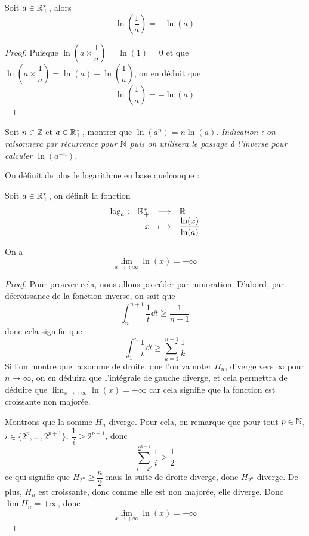 \begin{prop}
    Soit $a\in\mathbb{R}_+^*$, alors $$\ln\left(\dfrac{1}{a}\right) = -\ln(a)$$
\end{prop}

\begin{proof}
    Puisque $\ln\left(a\times \dfrac{1}{a}\right) = \ln(1) = 0$ et que $\ln\left(a\times \dfrac{1}{a}\right) = \ln(a) + \ln\left(\dfrac{1}{a}\right)$, on en déduit que $$\boxed{\ln\left(\dfrac{1}{a}\right) = -\ln(a)}$$
\end{proof}

\begin{exo}
    Soit $n\in\mathbb Z$ et $a\in\mathbb{R}_+^*$, montrer que $\ln(a^n) = n\ln(a)$. \textit{Indication : on raisonnera par récurrence pour $\mathbb{N}$ puis on utilisera le passage à l'inverse pour calculer $\ln(a^{-n})$.}
\end{exo}

On définit de plus le logarithme en base quelconque :

\begin{defi}
    Soit $a\in\mathbb{R}_+^*$, on définit la fonction $$\begin{array}[t]{lrcl} \log_a: & \mathbb{R}_+^* & \longrightarrow & \mathbb{R} \\ & x & \longmapsto & \dfrac{\ln(x)}{\ln(a)} \end{array}$$
\end{defi}

\begin{prop}
    On a $$\lim_{x\to+\infty}\ln(x) = +\infty$$
\end{prop}

\begin{proof}
    Pour prouver cela, nous allons procéder par minoration. D'abord, par décroissance de la fonction inverse, on sait que $$\int_{n}^{n+1}\frac{1}{t}\dd t \geq \frac{1}{n+1}$$ donc cela signifie que $$\int_{1}^n \frac{1}{t}\dd t \geq \sum_{k = 1}^{n-1}\frac{1}{k}$$ Si l'on montre que la somme de droite, que l'on va noter $H_n$, diverge vers $\infty$ pour $n\to\infty$, on en déduira que l'intégrale de gauche diverge, et cela permettra de déduire que $\displaystyle\lim_{x\to+\infty}\ln(x) = +\infty$ car cela signifie que la fonction est croissante non majorée.

    Montrons que la somme $H_n$ diverge. Pour cela, on remarque que pour tout $p\in \mathbb{N}$, $i \in\{2^p,\ldots,2^{p+1}\}$, $\dfrac{1}{i}\geq 2^{p+1}$, donc $$\sum_{i = 2^p}^{2^{p-1}} \frac{1}{i} \geq \frac{1}{2}$$ ce qui signifie que $H_{2^n} \geq \dfrac{n}{2}$ mais la suite de droite diverge, donc $H_{2^n}$ diverge. De plus, $H_n$ est croissante, donc comme elle est non majorée, elle diverge. Donc $\lim H_n = +\infty$, donc $$\boxed{\lim_{x\to+\infty}\ln(x) = +\infty}$$
\end{proof}

